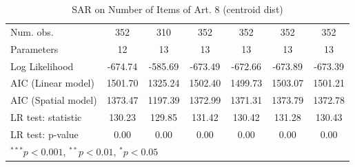 \begin{table}[!h]
\begin{center}
\begin{tabular}{l c c c c c c }
\midrule
Num. obs.               & 352          & 310          & 352          & 352          & 352          & 352          \\
Parameters              & 12           & 13           & 13           & 13           & 13           & 13           \\
Log Likelihood          & -674.74      & -585.69      & -673.49      & -672.66      & -673.89      & -673.39      \\
AIC (Linear model)      & 1501.70      & 1325.24      & 1502.40      & 1499.73      & 1503.07      & 1501.21      \\
AIC (Spatial model)     & 1373.47      & 1197.39      & 1372.99      & 1371.31      & 1373.79      & 1372.78      \\
LR test: statistic      & 130.23       & 129.85       & 131.42       & 130.42       & 131.28       & 130.43       \\
LR test: p-value        & 0.00         & 0.00         & 0.00         & 0.00         & 0.00         & 0.00         \\
\bottomrule
\multicolumn{7}{l}{\scriptsize{$^{***}p<0.001$, $^{**}p<0.01$, $^*p<0.05$}}
\end{tabular}
\caption{SAR on Number of Items of Art. 8 (centroid dist)}
\label{table:coefficients}
\end{center}
\end{table}
